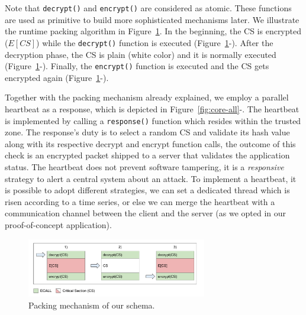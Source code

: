 Note that \texttt{decrypt()} and \texttt{encrypt()} are considered as atomic. 
These functions are used as primitive to build more sophisticated mechanisms 
later.
We illustrate the runtime packing algorithm in Figure~\ref{fig:dec1}.
In the beginning, the CS is encrypted (\ie $E[CS]$) while the 
\texttt{decrypt()} function is executed  (Figure~\ref{fig:dec1}-). 
After the decryption phase, the CS is plain (white color) and it is normally 
executed (Figure~\ref{fig:dec1}-).
Finally, the \texttt{encrypt()} function is executed and the CS gets encrypted 
again (Figure~\ref{fig:dec1}-).

Together with the packing mechanism already explained, we employ a parallel 
heartbeat as a response, which is depicted in 
Figure~\ref{fig:core-all}-.
The heartbeat is implemented by calling a \texttt{response()} function which 
resides within the trusted zone.
The response's duty is to select a random CS and validate its hash value along 
with its respective decrypt and encrypt function calls, the outcome of this 
check is an encrypted packet shipped to a server that validates the application 
status.
The heartbeat does not prevent software tampering, it is a \emph{responsive} 
strategy to alert a central system about an attack.
To implement a heartbeat, it is possible to adopt different strategies, \eg we 
can set a dedicated thread which is risen according to a time series, or else 
we can merge the heartbeat with a communication channel between the client and 
the server (as we opted in our proof-of-concept application).

\begin{figure}[b]
	\centering
	\includegraphics[width=0.7\textwidth]{fig_c3/dec1.pdf}
	\caption{Packing mechanism of our schema.}
	\label{fig:dec1}
\end{figure}


